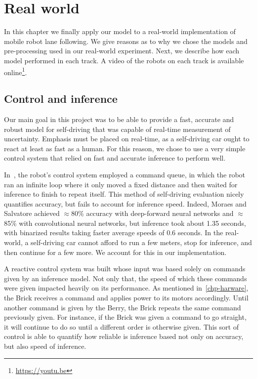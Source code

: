 
\chapter{Real world}\label{chp:realworld}

In this chapter we finally apply our model to a real-world implementation of mobile robot lane
following. We give reasons as to why we chose the models and pre-processing used in our real-world
experiment. Next, we describe how each model performed in each track. A video of the robots on each
track is available online\footnote{\url{https://youtu.be}}.

\section{Control and inference}

Our main goal in this project was to be able to provide a fast, accurate and robust model for
self-driving that was capable of real-time measurement of uncertainty. Emphasis must be placed on
real-time, as a self-driving car ought to react at least as fast as a human. For this reason, we
chose to use a very simple control system that relied on fast and accurate inference to perform
well.

In~\cite{self-driving}, the robot's control system employed a command queue, in which the robot ran
an infinite loop where it only moved a fixed distance and then waited for inference to finish to
repeat itself. This method of self-driving evaluation nicely quantifies accuracy, but fails to
account for inference speed. Indeed, Moraes and Salvatore achieved $\approx$80\% accuracy with
deep-forward neural networks and $\approx$85\% with convolutional neural networks, but inference
took about 1.35 seconds, with binarized results taking faster average speeds of 0.6 seconds. In the
real-world, a self-driving car cannot afford to run a few meters, stop for inference, and then
continue for a few more. We account for this in our implementation.

A reactive control system was built whose input was based solely on commands given by an inference
model. Not only that, the speed of which these commands were given impacted heavily on its
performance. As mentioned in~\autoref{chp-harware}, the Brick receives a command and applies power
to its motors accordingly. Until another command is given by the Berry, the Brick repeats the same
command previously given. For instance, if the Brick was given a command to go straight, it will
continue to do so until a different order is otherwise given. This sort of control is able to
quantify how reliable is inference based not only on accuracy, but also speed of inference.

